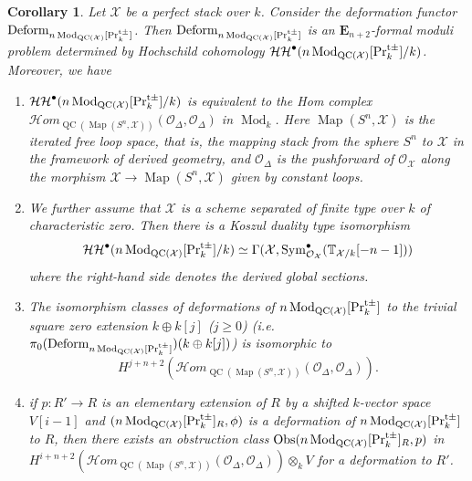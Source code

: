 \documentclass[leqno,12pt]{amsart}
\theoremstyle{plain}
\newtheorem{Corollary}[Theorem]{Corollary}
\theoremstyle{definition}
\newcommand{\HH}{\operatorname{\mathcal{HH}}}
\newcommand{\PRTTT}{\textup{Pr}^{\textup{t}\pm}}
\newcommand{\OO}{{\mathcal{O}}}
\newcommand{\Mod}{\operatorname{Mod}}
\newcommand{\Map}{\operatorname{Map}}
\newcommand{\QC}{\operatorname{QC}}
\newcommand{\XX}{\mathcal{X}}
\newcommand{\Sym}{\operatorname{Sym}}
\begin{document}
\begin{Corollary}
\label{intromain4}
Let $\XX$ be a perfect stack over $k$. 
Consider the deformation functor $\textup{Deform}_{n\Mod_{\QC(\mathcal{X})}[\PRTTT_k]}$.
Then $\textup{Deform}_{n\Mod_{\QC(\mathcal{X})}[\PRTTT_k]}$ is an $\mathbf{E}_{n+2}$-formal moduli problem
determined by Hochschild cohomology $\HH^\bullet(n\Mod_{\QC(\mathcal{X})}[\PRTTT_k]/k)$. Moreover, we have
\begin{enumerate}

\item $\HH^\bullet(n\Mod_{\QC(\mathcal{X})}[\PRTTT_k]/k)$ is equivalent to the Hom complex $\mathcal{H}om_{\QC(\Map(S^n,\mathcal{X}))}(\OO_{\Delta}, \OO_{\Delta})$
in $\Mod_k$. Here $\Map(S^n,\mathcal{X})$ is the iterated free loop space, that is, the mapping stack from the sphere $S^n$ to $\XX$ in the framework of derived geometry, and
$\OO_{\Delta}$ is the pushforward of $\OO_{\XX}$ along the morphism $\XX\to\Map(S^n,\XX)$ given by constant loops.



\item 
We further assume that $\XX$ is a scheme separated of finite type over $k$ of characteristic zero. 
Then there is a Koszul duality type isomorphism
\[
\HH^\bullet(n\Mod_{\QC(\mathcal{X})}[\PRTTT_k]/k)\simeq \Gamma(\XX,\Sym_{\OO_{\XX}}^{\bullet}(\mathbb{T}_{\XX/k}[-n-1]))
\]
where the right-hand side denotes the derived global sections.



\item 
The isomorphism classes of deformations of $n\Mod_{\QC(\mathcal{X})}[\PRTTT_k]$ to the trivial square zero extension $k\oplus k[j]$ ($j\ge0$) (i.e. $\pi_0(\textup{Deform}_{n\Mod_{\QC(\mathcal{X})}[\PRTTT_k]})(k\oplus k[j])$)
is isomorphic to
\[
H^{j+n+2}(\mathcal{H}om_{\QC(\Map(S^n,\mathcal{X}))}(\OO_{\Delta}, \OO_{\Delta})).
\]


\item if $p:R'\to R$ is an elementary extension of $R$ by a shifted $k$-vector space $V[i-1]$
and $(n\Mod_{\QC(\mathcal{X})}[\PRTTT_k]_R,\phi)$ is a deformation of $n\Mod_{\QC(\mathcal{X})}[\PRTTT_k]$ to $R$,
then there exists an obstruction class $\textup{Obs}(n\Mod_{\QC(\mathcal{X})}[\PRTTT_k]_R,p)$
in $H^{i+n+2}(\mathcal{H}om_{\QC(\Map(S^n,\mathcal{X}))}(\OO_{\Delta}, \OO_{\Delta}))\otimes_kV$ for a deformation to $R'$.

\end{enumerate}


\end{Corollary}
\end{document}
